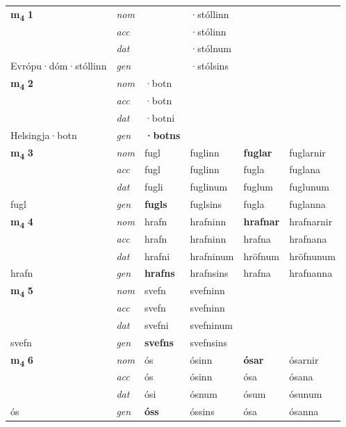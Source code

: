 \begin{longtable}[l]{X>{\footnotesize\itshape}XXXXX}
\multirow{3}{*}{{{\textbf{m{\textsubscript{4}}} \Large{\textbf{1}}}}} & nom &  & ·stóllinn & \textbf{} &  \\*
 & acc &  & ·stólinn &  &  \\*
 & dat &  & ·stólnum &  &  \\*
 {\footnotesize{Evrópu\allowbreak ·dóm\allowbreak ·stóllinn}} & gen & \textbf{} & ·stólsins &  &  \\
\cmidrule{1-6}

\multirow{3}{*}{{{\textbf{m{\textsubscript{4}}} \Large{\textbf{2}}}}} & nom & ·botn &  & \textbf{} &  \\*
 & acc & ·botn &  &  &  \\*
 & dat & ·botni &  &  &  \\*
 {\footnotesize{Helsingja\allowbreak ·botn}} & gen & \textbf{·botns} &  &  &  \\
\cmidrule{1-6}

\multirow{3}{*}{{{\textbf{m{\textsubscript{4}}} \Large{\textbf{3}}}}} & nom & fugl & fuglinn & \textbf{fuglar} & fuglarnir \\*
 & acc & fugl & fuglinn & fugla & fuglana \\*
 & dat & fugli & fuglinum & fuglum & fuglunum \\*
 {\footnotesize{fugl}} & gen & \textbf{fugls} & fuglsins & fugla & fuglanna \\
\cmidrule{1-6}

\multirow{3}{*}{{{\textbf{m{\textsubscript{4}}} \Large{\textbf{4}}}}} & nom & hrafn & hrafninn & \textbf{hrafnar} & hrafnarnir \\*
 & acc & hrafn & hrafninn & hrafna & hrafnana \\*
 & dat & hrafni & hrafninum & hröfnum & hröfnunum \\*
 {\footnotesize{hrafn}} & gen & \textbf{hrafns} & hrafnsins & hrafna & hrafnanna \\
\cmidrule{1-6}

\multirow{3}{*}{{{\textbf{m{\textsubscript{4}}} \Large{\textbf{5}}}}} & nom & svefn & svefninn & \textbf{} &  \\*
 & acc & svefn & svefninn &  &  \\*
 & dat & svefni & svefninum &  &  \\*
 {\footnotesize{svefn}} & gen & \textbf{svefns} & svefnsins &  &  \\
\cmidrule{1-6}

\multirow{3}{*}{{{\textbf{m{\textsubscript{4}}} \Large{\textbf{6}}}}} & nom & ós & ósinn & \textbf{ósar} & ósarnir \\*
 & acc & ós & ósinn & ósa & ósana \\*
 & dat & ósi & ósnum & ósum & ósunum \\*
 {\footnotesize{ós}} & gen & \textbf{óss} & óssins & ósa & ósanna \\
\cmidrule{1-6}


\end{longtable}
